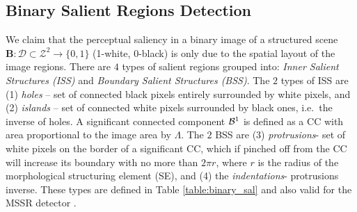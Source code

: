 \documentclass[conference,compsoc]{IEEEtran}
\def\B{{\mathbf B}}
\def\mcD{{\mathcal{D}}}
\begin{document}
\subsection{Binary Salient Regions Detection}
\label{ssec:binary}
We claim that the perceptual saliency in a binary image of a structured scene 
 $\B: \mcD \subset \mathcal{Z}^2 \rightarrow \{0,1\}$ (1-white, 0-black)
is only due to the spatial layout of the image regions. 
There are $4$ types of salient regions grouped into: {\em Inner Salient Structures (ISS)} and {\em Boundary Salient Structures (BSS)}. The $2$ types of ISS are (1) {\em holes} -- set of connected black pixels entirely surrounded by white pixels, and (2) {\em islands} -- set of connected white pixels surrounded by black ones, i.e.~the inverse of holes. A significant connected component ${\cal B}^1$ is defined as a CC with area proportional to the image area by $\Lambda$.
The $2$ BSS are (3) {\em protrusions}- set of white pixels on the border of a significant CC, which if pinched off from the CC will increase its boundary with no more than $2\pi r$, where $r$ is the radius of the morphological structuring element (SE), and (4) the {\em indentations}- protrusions inverse. 
These types are defined in Table \ref{table:binary_sal} and also valid for the MSSR detector \cite{RangHumpb06}. 
\end{document}
